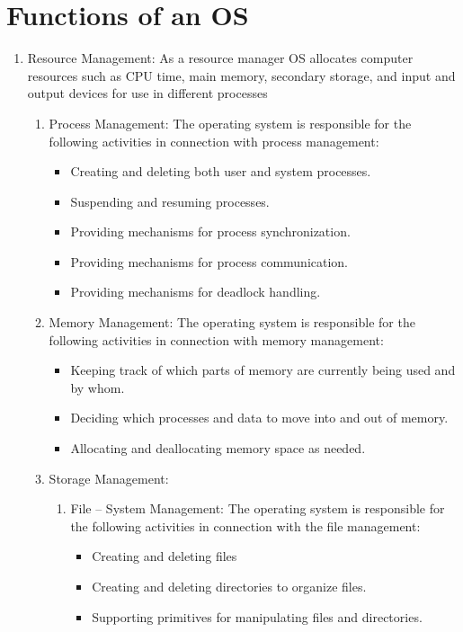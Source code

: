 \documentclass[11pt,a4paper]{article}
\begin{document}
	\newpage
	\section{Functions of an OS}
	\begin{enumerate}
		\item Resource Management: As a resource manager OS allocates computer resources such as CPU time, main memory, secondary storage, and input and output devices for use in different processes
		\begin{enumerate}
		  \item Process Management:  The operating system is responsible for the following activities in connection with process management:
		  \begin{itemize}
			\item Creating and deleting both user and system processes.
		  	\item Suspending and resuming processes.
		  	\item Providing mechanisms for process synchronization.
		  	\item Providing mechanisms for process communication.
		  	\item Providing mechanisms for deadlock handling.
		  \end{itemize}
		\item Memory Management:  The operating system is responsible for the following activities in connection with memory management:
		\begin{itemize}
			\item Keeping track of which parts of memory are currently being used and by whom.
			\item Deciding which processes and data to move into and out of memory.
			\item Allocating and deallocating memory space as needed.
		\end{itemize}
		\item Storage Management:
		\begin{enumerate}
		\item File – System Management:  The operating system is responsible for the following activities in connection with the file management:
		\begin{itemize}
		\item Creating and deleting files
		\item Creating and deleting directories to organize files.
		\item Supporting primitives for manipulating files and directories.

\end{itemize}
\end{enumerate}
\end{enumerate}
\end{enumerate}
\end{document}
